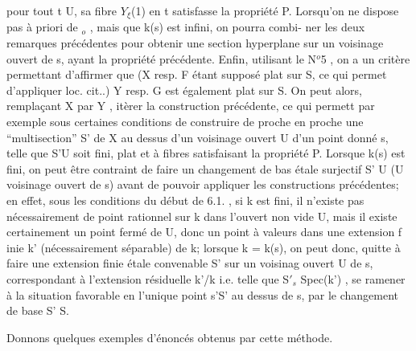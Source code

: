 pour tout t \hand{$\in$}U,  sa fibre $Y_{\xi}$(1) en  t satisfasse la propriété P.  Lorsqu'on ne
dispose pas à priori de \hand{$\xi$}$_{o}$ ,  mais que k(s) est infini, on pourra combi-%
ner les deux remarques précédentes pour obtenir une section hyperplane
sur un voisinage ouvert de s, ayant la propriété précédente.  Enfin,
utilisant le N$^{o}$5 , on a un critère permettant d'affirmer que (X resp. F étant
supposé plat sur S, ce qui permet d'appliquer loc. cit..)  Y\hand{$_{\xi}$} resp. G\hand{$_{\xi}$} est également
plat sur S. On peut alors, remplaçant X par Y\hand{$_{\xi}$} , itèrer la construction
précédente, ce qui permett par exemple\hand{,} sous certaines conditions de construire de proche en proche une
``multisection'' S' de X au dessus d'un voisinage ouvert U d'un point donné s,
telle que S'\hand{$\longrightarrow$}U soit fini, plat et à fibres satisfaisant la propriété P.
Lorsque k(s) est fini, on peut être contraint de faire un changement de bas%
étale surjectif S'\hand{$\longrightarrow$} U (U voisinage ouvert de s) avant de pouvoir appliquer
les constructions précédentes; en effet, sous les conditions du début de
6.1. , si k est fini, il n'existe pas nécessairement de point rationnel sur
k dans  l'ouvert non vide U, mais 
il existe certainement un point fermé de U, donc un point à valeurs dans
une extension f inie k' (nécessairement séparable) de k; lorsque k = k(s),
on peut donc, quitte à faire une extension finie étale convenable S' sur un voisinag%
ouvert U de  s, correspondant à l'extension résiduelle k'/k
i.e. telle que  S$'_{s}$ \hand{$\xrightarrow{\sim}$}Spec(k') , se ramener à la situation favorable 
en l'unique point s'\hand{$\in$}S' au dessus de s, par le changement de base S'\hand{$\to$} S.

Donnons quelques exemples d'énoncés obtenus par cette méthode. 
%

%
%

%

